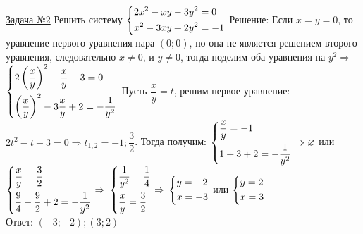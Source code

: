 \documentclass[a4paper,12pt]{article} %
\begin{document}
\label{Problem2}
\underline{Задача №2}
Решить систему $\begin{dcases}
	2x^2-xy-3y^2=0 \\
	x^2-3xy+2y^2=-1
\end{dcases}$\newline
Решение: Если $x=y=0$, то уравнение первого уравнения пара $(0;0)$, но она не
является решением второго уравнения, следовательно $x\ne0$, и $y\ne0$, тогда
поделим оба уравнения на $y^2 \Rightarrow$
$\begin{dcases}
	2\left( \dfrac{x}{y} \right)^2-\dfrac{x}{y}-3 = 0 \\
	\left( \dfrac{x}{y} \right)^2 - 3\dfrac{x}{y} + 2 = -\dfrac{1}{y^2}
\end{dcases}$ 
Пусть $\dfrac{x}{y}=t$, решим первое уравнение: $2t^2-t-3=0 \Rightarrow t_{1,2}=-1; \dfrac32$.
Тогда получим: 
$\begin{dcases}
	\dfrac{x}{y} = -1 \\
	1+3+2=-\dfrac{1}{y^2}
\end{dcases} \Rightarrow \varnothing$
или 
$\begin{dcases}
	\dfrac{x}{y} = \dfrac32 \\
	\dfrac94-\dfrac92+2=-\dfrac{1}{y^2}
\end{dcases} \Rightarrow $
$\begin{dcases}
	\dfrac1{y^2}=\dfrac14 \\
	\dfrac{x}{y} = \dfrac32
\end{dcases} \Rightarrow$
$\begin{dcases}	
	y=-2 \\
	x=-3
\end{dcases}$ или
$\begin{dcases}
	y=2 \\
	x=3
\end{dcases}$\\
Ответ: $(-3; -2); (3;2)$

\pagebreak
\end{document}
